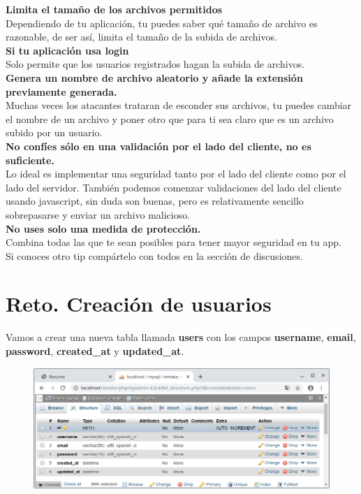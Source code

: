 \documentclass{article}
\begin{document}
\textbf{Limita el tamaño de los archivos permitidos}\\
Dependiendo de tu aplicación, tu puedes saber qué tamaño de archivo es
razonable, de ser así, limita el tamaño de la subida de archivos.\\

\textbf{Si tu aplicación usa login}\\
Solo permite que los usuarios registrados hagan la subida de archivos.\\

\textbf{Genera un nombre de archivo aleatorio y añade la extensión previamente
generada.}\\
Muchas veces los atacantes trataran de esconder sus archivos, tu puedes cambiar
el nombre de un archivo y poner otro que para ti sea claro que es un archivo
subido por un usuario.\\

\textbf{No confíes sólo en una validación por el lado del cliente, no es
suficiente.}\\
Lo ideal es implementar una seguridad tanto por el lado del cliente como por el
lado del servidor. También podemos comenzar validaciones del lado del cliente
usando javascript, sin duda son buenas, pero es relativamente sencillo
sobrepasarse y enviar un archivo malicioso.\\

\textbf{No uses solo una medida de protección.}\\
Combina todas las que te sean posibles para tener mayor seguridad en tu app.\\

Si conoces otro tip compártelo con todos en la sección de discusiones.\\

\newpage


\section{Reto. Creación de usuarios}%
Vamos a crear una nueva tabla llamada \textbf{users} con los campos
\textbf{username}, \textbf{email}, \textbf{password}, \textbf{created\_at} y
\textbf{updated\_at}.\\

\begin{figure}[h!]
  \centering
  \includegraphics[scale=0.5]{./Pictures/194_user_bd.png}
\end{figure}
\end{document}
